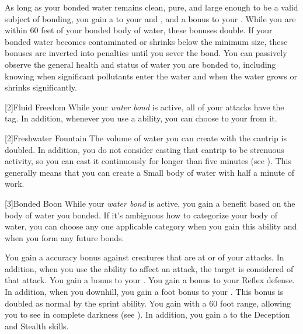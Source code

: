      As long as your bonded water remains clean, pure, and large enough to be a valid subject of bonding, you gain a   to your  and , and a  bonus to your .
      While you are within 60 feet of your bonded body of water, these bonuses double.
      If your bonded water becomes contaminated or shrinks below the minimum size, these bonuses are inverted into penalties until you sever the bond.
      You can passively observe the general health and status of water you are bonded to, including knowing when significant pollutants enter the water and when the water grows or shrinks significantly.

    [2]{Fluid Freedom} While your \textit{water bond} is active, all of your \magical attacks have the \atWater tag.
    In addition, whenever you use a \magical \atWater ability, you can choose to  your  from it.

    [2]{Freshwater Fountain} The volume of water you can create with the  cantrip is doubled.
    In addition, you do not consider casting that cantrip to be strenuous activity, so you can cast it continuously for longer than five minutes (see ).
    This generally means that you can create a Small body of water with half a minute of work.

    [3]{Bonded Boon} While your \textit{water bond} is active, you gain a benefit based on the body of water you bonded.
    If it's ambiguous how to categorize your body of water, you can choose any one applicable category when you gain this ability and when you form any future bonds.
    \begin{raggeditemize}
       You gain a  accuracy bonus against creatures that are at \unaware or \partiallyunaware of your attacks.
        In addition, when you use the  ability to affect an attack, the target is considered \partiallyunaware of that attack.
       You gain a  bonus to your .
       You gain a  bonus to your Reflex defense.
        In addition, when you  downhill, you gain a  foot bonus to your .
        This bonus is doubled as normal by the sprint ability.
       You gain  with a 60 foot range, allowing you to see in complete darkness (see ).
        In addition, you gain a   to the Deception and Stealth skills.
    \end{raggeditemize}

